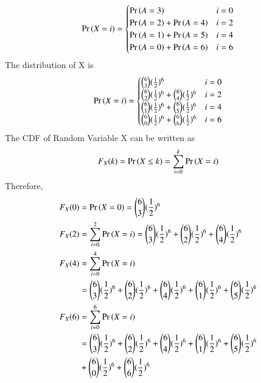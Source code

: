 \documentclass[journal,12pt,twocolumn]{IEEEtran}
\begin{document}
\begin{align}
        \Pr\left(X=i\right) = 
        \begin{cases}
            \Pr\left(A=3\right) & i=0\\
            \Pr\left(A=2\right)+\Pr\left(A=4\right) & i=2\\
            \Pr\left(A=1\right)+\Pr\left(A=5\right) & i=4\\
            \Pr\left(A=0\right)+\Pr\left(A=6\right) & i=6
        \end{cases}
    \end{align}
The distribution of X is
\begin{align}
        \Pr\left(X=i\right) = 
        \begin{cases}
            \binom{6}{3}(\frac{1}{2})^6 & i=0\\
            \binom{6}{2}(\frac{1}{2})^6 + \binom{6}{4}(\frac{1}{2})^6 & i=2\\
            \binom{6}{1}(\frac{1}{2})^6 + \binom{6}{5}(\frac{1}{2})^6 & i=4\\
            \binom{6}{0}(\frac{1}{2})^6 + \binom{6}{6}(\frac{1}{2})^6& i=6
        \end{cases}
    \end{align}
The CDF of Random Variable X can be written as
\begin{align}
F_X(k)=\Pr\left(X \leq k\right) =\sum_{i=0}^{k}\Pr\left(X=i\right)
    \end{align}
Therefore,
\begin{align}
F_X(0)&=\Pr\left(X=0\right)= \binom{6}{3}(\frac{1}{2})^6\\
F_X(2)&=\sum_{i=0}^{2}\Pr\left(X=i\right)= \binom{6}{3}(\frac{1}{2})^6 +\binom{6}{2}(\frac{1}{2})^6 + \binom{6}{4}(\frac{1}{2})^6\\
F_X(4)&=\sum_{i=0}^{4}\Pr\left(X=i\right) \nonumber
\\&=\binom{6}{3}(\frac{1}{2})^6 +\binom{6}{2}(\frac{1}{2})^6 + \binom{6}{4}(\frac{1}{2})^6 +\binom{6}{1}(\frac{1}{2})^6 + \binom{6}{5}(\frac{1}{2})^6\\
F_X(6)&=\sum_{i=0}^{6}\Pr\left(X=i\right) \nonumber
\\&=\binom{6}{3}(\frac{1}{2})^6 +\binom{6}{2}(\frac{1}{2})^6 + \binom{6}{4}(\frac{1}{2})^6 +\binom{6}{1}(\frac{1}{2})^6 + \binom{6}{5}(\frac{1}{2})^6\nonumber
\\&+\binom{6}{0}(\frac{1}{2})^6 + \binom{6}{6}(\frac{1}{2})^6
    \end{align}
\end{document}
